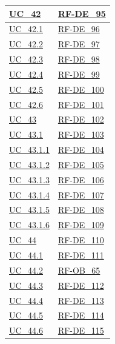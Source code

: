 \begin{longtable}{|
        >{\raggedright\arraybackslash}p{} |
        >{\raggedright\arraybackslash}p{} |
    }
    \hyperref[uc_42]{UC\_42} & \hyperlink{rf-de_95}{RF-DE\_95} \\
    \hline
    \hyperref[uc_42.1]{UC\_42.1} & \hyperlink{rf-de_96}{RF-DE\_96} \\
    \hline
    \hyperref[uc_42.2]{UC\_42.2} & \hyperlink{rf-de_97}{RF-DE\_97} \\
    \hline
    \hyperref[uc_42.3]{UC\_42.3} & \hyperlink{rf-de_98}{RF-DE\_98} \\
    \hline
    \hyperref[uc_42.4]{UC\_42.4} & \hyperlink{rf-de_99}{RF-DE\_99} \\
    \hline
    \hyperref[uc_42.5]{UC\_42.5} & \hyperlink{rf-de_100}{RF-DE\_100} \\
    \hline
    \hyperref[uc_42.6]{UC\_42.6} & \hyperlink{rf-de_101}{RF-DE\_101} \\
    \hline

    \hyperref[uc_43]{UC\_43} & \hyperlink{rf-de_102}{RF-DE\_102} \\
    \hline
    \hyperref[uc_43.1]{UC\_43.1} & \hyperlink{rf-de_103}{RF-DE\_103} \\
    \hline
    \hyperref[uc_43.1.1]{UC\_43.1.1} & \hyperlink{rf-de_104}{RF-DE\_104} \\
    \hline
    \hyperref[uc_43.1.2]{UC\_43.1.2} & \hyperlink{rf-de_105}{RF-DE\_105} \\
    \hline
    \hyperref[uc_43.1.3]{UC\_43.1.3} & \hyperlink{rf-de_106}{RF-DE\_106} \\
    \hline
    \hyperref[uc_43.1.4]{UC\_43.1.4} & \hyperlink{rf-de_107}{RF-DE\_107} \\
    \hline
    \hyperref[uc_43.1.5]{UC\_43.1.5} & \hyperlink{rf-de_108}{RF-DE\_108} \\
    \hline
    \hyperref[uc_43.1.6]{UC\_43.1.6} & \hyperlink{rf-de_109}{RF-DE\_109} \\
    \hline

    \hyperref[uc_44]{UC\_44} & \hyperlink{rf-de_110}{RF-DE\_110} \\
    \hline
    \hyperref[uc_44.1]{UC\_44.1} & \hyperlink{rf-de_111}{RF-DE\_111} \\
    \hline
    \hyperref[uc_44.2]{UC\_44.2} & \hyperlink{rf-ob_65}{RF-OB\_65} \\
    \hline
    \hyperref[uc_44.3]{UC\_44.3} & \hyperlink{rf-de_112}{RF-DE\_112} \\
    \hline
    \hyperref[uc_44.4]{UC\_44.4} & \hyperlink{rf-de_113}{RF-DE\_113} \\
    \hline
    \hyperref[uc_44.5]{UC\_44.5} & \hyperlink{rf-de_114}{RF-DE\_114} \\
    \hline
    \hyperref[uc_44.6]{UC\_44.6} & \hyperlink{rf-de_115}{RF-DE\_115} \\
    \hline


\end{longtable}
